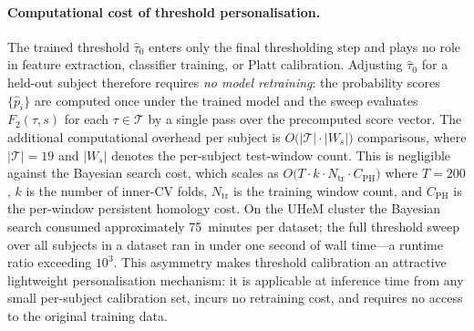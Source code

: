\paragraph{Computational cost of threshold personalisation.}
The trained threshold $\hat\tau_0$ enters only the final thresholding step
and plays no role in feature extraction, classifier training, or Platt calibration.
Adjusting $\hat\tau_0$ for a held-out subject therefore requires \emph{no model retraining}:
the probability scores $\{\hat{p}_i\}$ are computed once under the trained model and
the sweep evaluates $F_2(\tau,s)$ for each $\tau\in\mathcal{T}$ by a single pass over
the precomputed score vector.  The additional computational overhead per subject is
$O\bigl(|\mathcal{T}|\cdot|W_s|\bigr)$ comparisons, where $|\mathcal{T}|=19$ and
$|W_s|$ denotes the per-subject test-window count.  This is negligible against the
Bayesian search cost, which scales as
$O\bigl(T\cdot k\cdot N_{\mathrm{tr}}\cdot C_{\mathrm{PH}}\bigr)$
where $T=200$, $k$ is the number of inner-CV folds, $N_{\mathrm{tr}}$ is the training
window count, and $C_{\mathrm{PH}}$ is the per-window persistent homology cost.
On the UHeM cluster the Bayesian search consumed approximately 75~minutes per dataset;
the full threshold sweep over all subjects in a dataset ran in under one second of wall
time---a runtime ratio exceeding $10^3$.  This asymmetry makes threshold calibration an
attractive lightweight personalisation mechanism: it is applicable at inference time
from any small per-subject calibration set, incurs no retraining cost, and requires no
access to the original training data.

